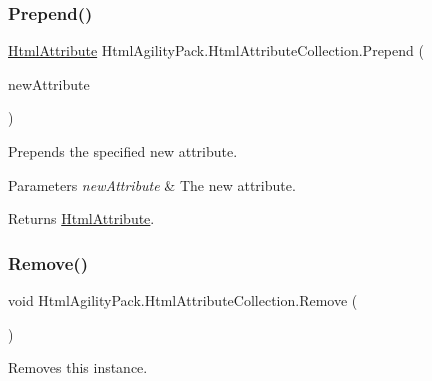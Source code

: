 \subsubsection{\texorpdfstring{Prepend()}{Prepend()}}
{\footnotesize\ttfamily \hyperlink{class_html_agility_pack_1_1_html_attribute}{Html\+Attribute} Html\+Agility\+Pack.\+Html\+Attribute\+Collection.\+Prepend (\begin{DoxyParamCaption}\item[{\hyperlink{class_html_agility_pack_1_1_html_attribute}{Html\+Attribute}}]{new\+Attribute }\end{DoxyParamCaption})\hspace{0.3cm}{\ttfamily [inline]}}



Prepends the specified new attribute. 


\begin{DoxyParams}{Parameters}
{\em new\+Attribute} & The new attribute.\\
\hline
\end{DoxyParams}
\begin{DoxyReturn}{Returns}
\hyperlink{class_html_agility_pack_1_1_html_attribute}{Html\+Attribute}.
\end{DoxyReturn}
\mbox{\label{class_html_agility_pack_1_1_html_attribute_collection_a7fa898935a74ae311c6c946f713a1985}} 
\subsubsection{\texorpdfstring{Remove()}{Remove()}\hspace{0.1cm}{\footnotesize\ttfamily [1/3]}}
{\footnotesize\ttfamily void Html\+Agility\+Pack.\+Html\+Attribute\+Collection.\+Remove (\begin{DoxyParamCaption}{ }\end{DoxyParamCaption})\hspace{0.3cm}{\ttfamily [inline]}}



Removes this instance. 

\mbox{\label{class_html_agility_pack_1_1_html_attribute_collection_a7a470d1728030dcec2613cff64b62a98}} 
